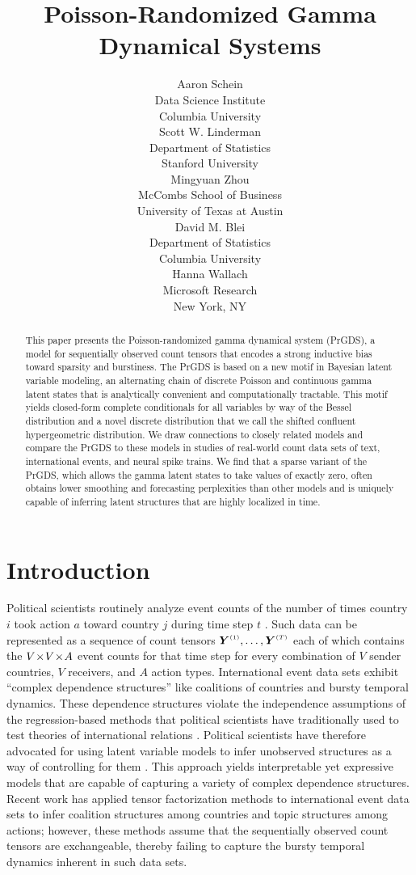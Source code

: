 \documentclass{article}
\title{Poisson-Randomized Gamma Dynamical Systems}
\author{%
  Aaron Schein \\
  Data Science Institute\\
  Columbia University\\
  \And
  Scott W. Linderman \\
  Department of Statistics\\
  Stanford University\\
  \AND
  Mingyuan Zhou \\
  McCombs School of Business\\
  University of Texas at Austin\\
  \And
  David M. Blei \\
  Department of Statistics\\
  Columbia University\\
  \And
  Hanna Wallach \\
  Microsoft Research\\
  New York, NY\\
}
\begin{document}
\maketitle

\begin{abstract}
This paper presents the Poisson-randomized gamma dynamical system (PrGDS), a model for sequentially observed count tensors that encodes a strong inductive bias toward sparsity and burstiness. The PrGDS is based on a new motif in Bayesian latent variable modeling, an alternating chain of discrete Poisson and continuous gamma latent states that is analytically convenient and computationally tractable. This motif yields closed-form complete conditionals for all variables by way of the Bessel distribution and a novel discrete distribution that we call the shifted confluent hypergeometric distribution. We draw connections to closely related models and compare the PrGDS to these models in studies of real-world count data sets of text, international events, and neural spike trains. We find that a sparse variant of the PrGDS, which allows the gamma latent states to take values of exactly zero, often obtains lower smoothing and forecasting perplexities than other models and is uniquely capable of inferring latent structures that are highly localized in time.~
\end{abstract}

\section{Introduction}

Political scientists routinely analyze event counts of the number of times country $i$ took action $a$ toward country $j$ during time step $t$ \cite{schrodt1995event}. Such data can be represented as a sequence of count tensors $\Yten^{\mathsmaller{(1)}},\dots,\Yten^{\mathsmaller{(T)}}$ each of which contains the $V \!\times\! V \!\times\! A$ event counts for that time step for every combination of $V$ sender countries, $V$ receivers, and $A$ action types. International event data sets exhibit ``complex dependence structures'' \citep{king2001proper} like coalitions of countries and bursty temporal dynamics. These dependence structures violate the independence assumptions of the regression-based methods that political scientists have traditionally used to test theories of international relations \cite{green2001dirty,poast2010mis,erikson2014dyadic}. Political scientists have therefore advocated for using latent variable models to infer unobserved structures as a way of controlling for them \cite{stewart2014latent}. This approach yields interpretable yet expressive models that are capable of capturing a variety of complex dependence structures. Recent work has applied tensor factorization methods to international event data sets \cite{hoff2004modeling,hoff2015multilinear,schein2015bayesian,hoff2016equivariant,schein2016bayesian} to infer coalition structures among countries and topic structures among actions; however, these methods assume that the sequentially observed count tensors are exchangeable, thereby failing to capture the bursty temporal dynamics inherent in such data sets.~
\end{document}
